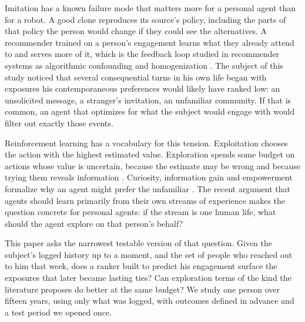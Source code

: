 \documentclass[11pt]{article}
\begin{document}
Imitation has a known failure mode that matters more for a personal agent than for a robot. A good clone reproduces its source's policy, including the parts of that policy the person would change if they could see the alternatives. A recommender trained on a person's engagement learns what they already attend to and serves more of it, which is the feedback loop studied in recommender systems as algorithmic confounding and homogenization \citep{chaney2018algorithmic}. The subject of this study noticed that several consequential turns in his own life began with exposures his contemporaneous preferences would likely have ranked low: an unsolicited message, a stranger's invitation, an unfamiliar community. If that is common, an agent that optimizes for what the subject would engage with would filter out exactly those events.

Reinforcement learning has a vocabulary for this tension. Exploitation chooses the action with the highest estimated value. Exploration spends some budget on actions whose value is uncertain, because the estimate may be wrong and because trying them reveals information \citep{auer2002finite,russo2018tutorial}. Curiosity, information gain and empowerment formalize why an agent might prefer the unfamiliar \citep{schmidhuber2010formal,houlsby2011bayesian,pathak2017curiosity,klyubin2005empowerment}. The recent argument that agents should learn primarily from their own streams of experience \citep{silver2025era} makes the question concrete for personal agents: if the stream is one human life, what should the agent explore on that person's behalf?

This paper asks the narrowest testable version of that question. Given the subject's logged history up to a moment, and the set of people who reached out to him that week, does a ranker built to predict his engagement surface the exposures that later became lasting ties? Can exploration terms of the kind the literature proposes do better at the same budget? We study one person over fifteen years, using only what was logged, with outcomes defined in advance and a test period we opened once.
\end{document}
